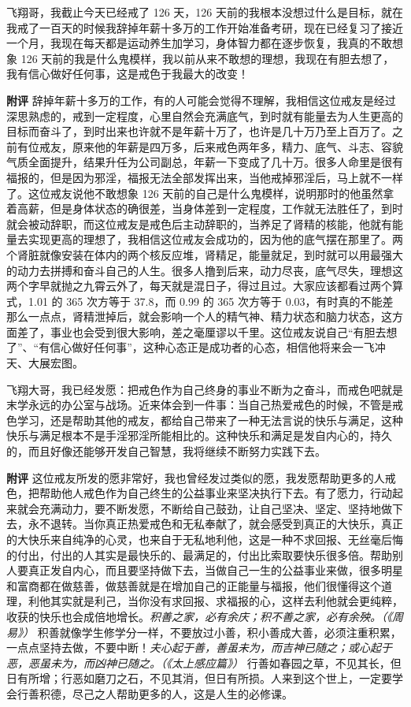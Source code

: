 \begin{case}
    飞翔哥，我截止今天已经戒了 126 天，126 天前的我根本没想过什么是目标，就在我戒了一百天的时候我辞掉年薪十多万的工作开始准备考研，现在已经复习了接近一个月，我现在每天都是运动养生加学习，身体智力都在逐步恢复，我真的不敢想象 126 天前的我是什么鬼模样，我以前从来不敢想的理想，我现在有胆去想了，我有信心做好任何事，这是戒色于我最大的改变！

    \textbf{附评} 辞掉年薪十多万的工作，有的人可能会觉得不理解，我相信这位戒友是经过深思熟虑的，戒到一定程度，心里自然会充满底气，到时就有能量去为人生更高的目标而奋斗了，到时出来也许就不是年薪十万了，也许是几十万乃至上百万了。之前有位戒友，原来他的年薪是四万多，后来戒色两年多，精力、底气、斗志、容貌气质全面提升，结果升任为公司副总，年薪一下变成了几十万。很多人命里是很有福报的，但是因为邪淫，福报无法全部发挥出来，当他戒掉邪淫后，马上就不一样了。这位戒友说他不敢想象 126 天前的自己是什么鬼模样，说明那时的他虽然拿着高薪，但是身体状态的确很差，当身体差到一定程度，工作就无法胜任了，到时就会被动辞职，而这位戒友是戒色后主动辞职的，当养足了肾精的核能，他就有能量去实现更高的理想了，我相信这位戒友会成功的，因为他的底气摆在那里了。两个肾脏就像安装在体内的两个核反应堆，肾精足，能量就足，到时就可以用最强大的动力去拼搏和奋斗自己的人生。很多人撸到后来，动力尽丧，底气尽失，理想这两个字早就抛之九霄云外了，每天就是混日子，得过且过。大家应该都看过两个算式，1.01 的 365 次方等于 37.8，而 0.99 的 365 次方等于 0.03，有时真的不能差那么一点点，肾精泄掉后，就会影响一个人的精气神、精力状态和脑力状态，这方面差了，事业也会受到很大影响，差之毫厘谬以千里。这位戒友说自己“有胆去想了”、“有信心做好任何事”，这种心态正是成功者的心态，相信他将来会一飞冲天、大展宏图。
\end{case}

\begin{case}
    飞翔大哥，我已经发愿：把戒色作为自己终身的事业不断为之奋斗，而戒色吧就是末学永远的办公室与战场。近来体会到一件事：当自己热爱戒色的时候，不管是戒色学习，还是帮助其他的戒友，都给自己带来了一种无法言说的快乐与满足，这种快乐与满足根本不是手淫邪淫所能相比的。这种快乐和满足是发自内心的，持久的，而且好像还能够开发自己智慧，我将继续不断努力实践下去。

    \textbf{附评} 这位戒友所发的愿非常好，我也曾经发过类似的愿，我发愿帮助更多的人戒色，把帮助他人戒色作为自己终生的公益事业来坚决执行下去。有了愿力，行动起来就会充满动力，要不断发愿，不断给自己鼓劲，让自己坚决、坚定、坚持地做下去，永不退转。当你真正热爱戒色和无私奉献了，就会感受到真正的大快乐，真正的大快乐来自纯净的心灵，也来自于无私地利他，这是一种不求回报、无丝毫后悔的付出，付出的人其实是最快乐的、最满足的，付出比索取要快乐很多倍。帮助别人要真正发自内心，而且要坚持做下去，当做自己一生的公益事业来做，很多明星和富商都在做慈善，做慈善就是在增加自己的正能量与福报，他们很懂得这个道理，利他其实就是利己，当你没有求回报、求福报的心，这样去利他就会更纯粹，收获的快乐也会成倍地增长。\textit{积善之家，必有余庆；积不善之家，必有余殃。（《周易》）} 积善就像学生修学分一样，不要放过小善，积小善成大善，必须注重积累，一点点坚持去做，不要中断！\textit{夫心起于善，善虽未为，而吉神已随之；或心起于恶，恶虽未为，而凶神已随之。（《太上感应篇》）} 行善如春园之草，不见其长，但日有所增；行恶如磨刀之石，不见其消，但日有所损。人来到这个世上，一定要学会行善积德，尽己之人帮助更多的人，这是人生的必修课。
\end{case}

